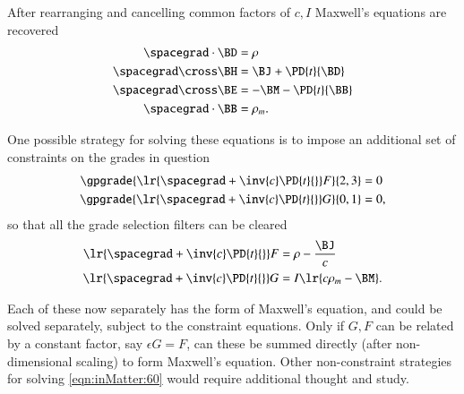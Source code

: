 After rearranging and cancelling common factors of \( c, I \) Maxwell's equations are recovered
\begin{dmath}\label{eqn:inMatter:180}
\begin{aligned}
\spacegrad \cdot \BD &= \rho \\
\spacegrad \cross \BH &= \BJ + \PD{t}{\BD}  \\
\spacegrad \cross \BE &= -\BM - \PD{t}{\BB} \\
\spacegrad \cdot \BB &= \rho_m.
\end{aligned}
\end{dmath}

One possible strategy for solving these equations is to impose an additional set of constraints on the grades in question
\begin{dmath}\label{eqn:inMatter:200}
\begin{aligned}
\gpgrade{ \lr{ \spacegrad + \inv{c} \PD{t}{} } F }{2,3} &= 0 \\
\gpgrade{ \lr{ \spacegrad + \inv{c} \PD{t}{} } G }{0,1} &= 0,
\end{aligned}
\end{dmath}
so that all the grade selection filters can be cleared
\begin{dmath}\label{eqn:inMatter:220}
\begin{aligned}
\lr{ \spacegrad + \inv{c} \PD{t}{} } F &= \rho - \frac{\BJ}{c} \\
\lr{ \spacegrad + \inv{c} \PD{t}{} } G &= I \lr{ c \rho_m - \BM }.
\end{aligned}
\end{dmath}

Each of these now separately has the form of Maxwell's equation, and could be solved separately, subject to the constraint equations.
Only if \( G, F \) can be related by a constant factor, say \( \epsilon G = F \), can these be summed directly (after non-dimensional scaling) to form Maxwell's equation.
Other non-constraint strategies for solving \cref{eqn:inMatter:60} would require additional thought and study.
